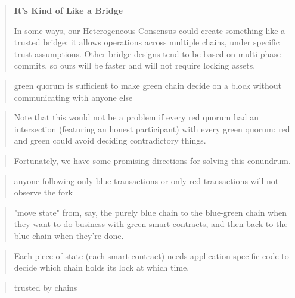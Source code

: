 \documentclass{article}
\theoremstyle{definition}
\begin{document}
\begin{quote}
  \textbf{It's Kind of Like a Bridge}

  In some ways, 
  our Heterogeneous Consensus could create something like 
  a trusted bridge: 
  it allows operations across multiple chains,
  under specific trust assumptions. 
  Other bridge designs tend to be based on multi-phase commits,
  so ours will be faster and will not require locking assets.
\end{quote}

\begin{quote}
  green quorum is sufficient to make green chain decide on a block without communicating with anyone else
\end{quote}

 \begin{quote}
   Note that this would not be a problem if every red quorum had an intersection (featuring an honest participant) with every green quorum: red and green could avoid deciding contradictory things.
 \end{quote}

 \begin{quote}
    Fortunately, we have some promising directions for solving this conundrum.
  \end{quote}

\begin{quote}
    anyone following only blue transactions or only red transactions will not observe the fork
\end{quote}

  \begin{quote}
  "move state" from, say, the purely blue chain to the blue-green chain when they want to do business with green smart contracts, and then back to the blue chain when they're done.
\end{quote}

\begin{quote}
  Each piece of state (each smart contract) needs application-specific code to decide which chain holds its lock at which time.
\end{quote}
\begin{quote}
  trusted by chains
\end{quote}
\end{document}
